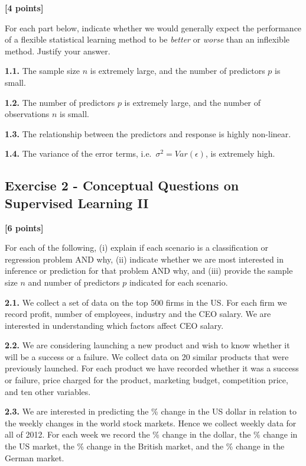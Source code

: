 \documentclass[
  letterpaper,
  DIV=11,
  numbers=noendperiod]{scrartcl}
\begin{document}
\textbf{{[}4 points{]}}

For each part below, indicate whether we would generally expect the
performance of a flexible statistical learning method to be
\emph{better} or \emph{worse} than an inflexible method. Justify your
answer.

\textbf{1.1.} The sample size \(n\) is extremely large, and the number
of predictors \(p\) is small.

\textbf{1.2.} The number of predictors \(p\) is extremely large, and the
number of observations \(n\) is small.

\textbf{1.3.} The relationship between the predictors and response is
highly non-linear.

\textbf{1.4.} The variance of the error terms,
i.e.~\(\sigma^2 = Var(\epsilon)\), is extremely high.

\subsection{Exercise 2 - Conceptual Questions on Supervised Learning
II}\label{exercise-2---conceptual-questions-on-supervised-learning-ii}

\textbf{{[}6 points{]}}

For each of the following, (i) explain if each scenario is a
classification or regression problem AND why, (ii) indicate whether we
are most interested in inference or prediction for that problem AND why,
and (iii) provide the sample size \(n\) and number of predictors \(p\)
indicated for each scenario.

\textbf{2.1.} We collect a set of data on the top 500 firms in the US.
For each firm we record profit, number of employees, industry and the
CEO salary. We are interested in understanding which factors affect CEO
salary.

\textbf{2.2.} We are considering launching a new product and wish to
know whether it will be a success or a failure. We collect data on 20
similar products that were previously launched. For each product we have
recorded whether it was a success or failure, price charged for the
product, marketing budget, competition price, and ten other variables.

\textbf{2.3.} We are interested in predicting the \% change in the US
dollar in relation to the weekly changes in the world stock markets.
Hence we collect weekly data for all of 2012. For each week we record
the \% change in the dollar, the \% change in the US market, the \%
change in the British market, and the \% change in the German market.
\end{document}
